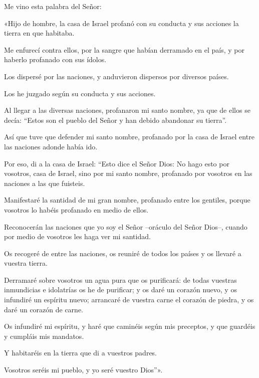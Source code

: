 \begin{readprose}
Me vino esta palabra del Señor: 
	
«Hijo de hombre, la casa de Israel profanó con su conducta 
   y sus acciones la tierra en que habitaba. 

Me enfurecí contra ellos, 
   por la sangre que habían derramado en el país, 
   y por haberlo profanado con sus ídolos. 

Los dispersé por las naciones, 
   y anduvieron dispersos por diversos países. 

Los he juzgado según su conducta y sus acciones. 

Al llegar a las diversas naciones, 
   profanaron mi santo nombre, 
   ya que de ellos se decía: 
   “Estos son el pueblo del Señor 
   y han debido abandonar su tierra”. 

Así que tuve que defender mi santo nombre, 
   profanado por la casa de Israel 
   entre las naciones adonde había ido. 

Por eso, di a la casa de Israel: 
   “Esto dice el Señor Dios: 
   No hago esto por vosotros, casa de Israel, 
   sino por mi santo nombre, profanado por vosotros 
   en las naciones a las que fuisteis. 

Manifestaré la santidad de mi gran nombre, 
   profanado entre los gentiles, 
   porque vosotros lo habéis profanado en medio de ellos. 

Reconocerán las naciones que yo soy el Señor 
   –oráculo del Señor Dios–, 
   cuando por medio de vosotros les haga ver mi santidad. 

Os recogeré de entre las naciones, 
   os reuniré de todos los países 
   y os llevaré a vuestra tierra. 

Derramaré sobre vosotros un agua pura 
   que os purificará: 
   de todas vuestras inmundicias e idolatrías 
   os he de purificar; 
   y os daré un corazón nuevo, 
   y os infundiré un espíritu nuevo; 
   arrancaré de vuestra carne el corazón de piedra, 
   y os daré un corazón de carne. 

Os infundiré mi espíritu, 
   y haré que caminéis según mis preceptos, 
   y que guardéis y cumpláis mis mandatos. 

Y habitaréis en la tierra que di a vuestros padres. 

Vosotros seréis mi pueblo, 
   y yo seré vuestro Dios”».
\end{readprose}


